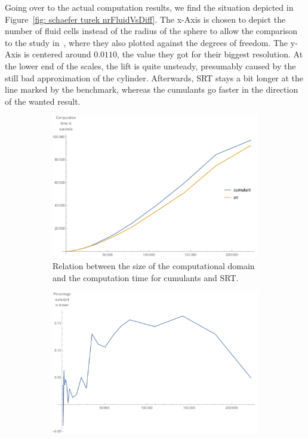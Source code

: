 Going over to the actual computation results, we find the situation depicted in Figure~\ref{fig: schaefer turek nrFluidVsDiff}.
The x-Axis is chosen to depict the number of fluid cells instead of the radius of the sphere to allow the comparison to the study in~\cite{schafer1996benchmark}, where they also plotted against the degrees of freedom.
The y-Axis is centered around $0.0110$, the value they got for their biggest resolution.
At the lower end of the scales, the lift is quite unsteady, presumably caused by the still bad approximation of the cylinder.
Afterwards, SRT stays a bit longer at the line marked by the benchmark, whereas the cumulants go faster in the direction of the wanted result.

\begin{figure}
\centering
\begin{subfigure}{.48\textwidth}
  \centering
  \includegraphics[width=\linewidth]{../figures/schaeferTurekLift_domainVsTime.pdf} %
  \caption{Relation between the size of the computational domain and the computation time for cumulants and SRT.}
\label{fig: schaefer turek domain vs time}
\end{subfigure}\hfill
\begin{subfigure}{.48\textwidth}
  \centering
  \includegraphics[width=\linewidth]{../figures/schaeferTurekLift_performanceGap.pdf} %

\end{subfigure}
\end{figure}
